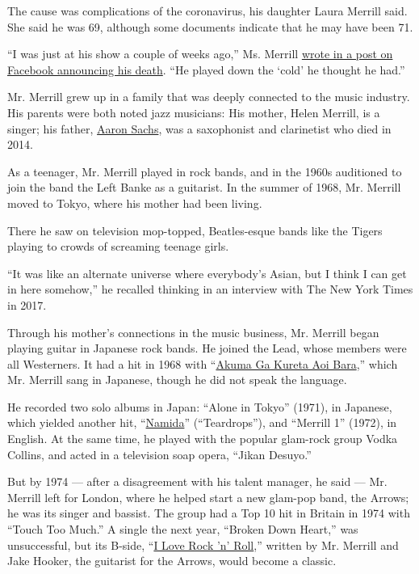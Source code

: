 The cause was complications of the coronavirus, his daughter Laura
Merrill said. She said he was 69, although some documents indicate that
he may have been 71.

``I was just at his show a couple of weeks ago,'' Ms. Merrill
\href{https://www.facebook.com/iLookok/posts/10163563888920227}{wrote in
a post on Facebook announcing his death}. ``He played down the `cold' he
thought he had.''

Mr. Merrill grew up in a family that was deeply connected to the music
industry. His parents were both noted jazz musicians: His mother, Helen
Merrill, is a singer; his father,
\href{https://web.archive.org/web/20140626145656/http://news.allaboutjazz.com/aaron-sachs-and-jimmy-scott-gone.php}{Aaron
Sachs}, was a saxophonist and clarinetist who died in 2014.

As a teenager, Mr. Merrill played in rock bands, and in the 1960s
auditioned to join the band the Left Banke as a guitarist. In the summer
of 1968, Mr. Merrill moved to Tokyo, where his mother had been living.

There he saw on television mop-topped, Beatles-esque bands like the
Tigers playing to crowds of screaming teenage girls.

``It was like an alternate universe where everybody's Asian, but I think
I can get in here somehow,'' he recalled thinking in an interview with
The New York Times in 2017.

Through his mother's connections in the music business, Mr. Merrill
began playing guitar in Japanese rock bands. He joined the Lead, whose
members were all Westerners. It had a hit in 1968 with
``\href{https://www.youtube.com/watch?v=gifDVY5mYbs}{Akuma Ga Kureta Aoi
Bara},'' which Mr. Merrill sang in Japanese, though he did not speak the
language.

He recorded two solo albums in Japan: ``Alone in Tokyo'' (1971), in
Japanese, which yielded another hit,
``\href{https://www.youtube.com/watch?v=k4U9D5IB3Ms}{Namida}''
(``Teardrops''), and ``Merrill 1'' (1972), in English. At the same time,
he played with the popular glam-rock group Vodka Collins, and acted in a
television soap opera, ``Jikan Desuyo.''

But by 1974 --- after a disagreement with his talent manager, he said
--- Mr. Merrill left for London, where he helped start a new glam-pop
band, the Arrows; he was its singer and bassist. The group had a Top 10
hit in Britain in 1974 with ``Touch Too Much.'' A single the next year,
``Broken Down Heart,'' was unsuccessful, but its B-side,
``\href{https://www.youtube.com/watch?v=8AT_Pbtyid0}{I Love Rock 'n'
Roll},'' written by Mr. Merrill and Jake Hooker, the guitarist for the
Arrows, would become a classic.

